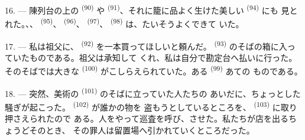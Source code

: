 16. --- 陳列台の上の \textsuperscript{(90)} や
\textsuperscript{(91)}、それに籠に品よく生けた美しい \textsuperscript{(94)} にも
見とれた。、、
\textsuperscript{(95)}、 \textsuperscript{(96)}、
\textsuperscript{(97)}、 \textsuperscript{(98)} は、たいそうよくできて
いた。

\VUsaut{4.4mm}
\VUsaut{2.8mm}

17. --- 私は祖父に、 \textsuperscript{(92)} を一本買ってほしいと頼んだ。
 \textsuperscript{(93)} のそばの箱に入っていたものである。祖父は承知して
くれ、私は自分で勘定台へ払いに行った。そのそばでは大きな
\textsuperscript{(100)} がこしらえられていた。ある \textsuperscript{(99)} あての
ものである。

18. --- 突然、美術の \textsuperscript{(101)} のそばに立っていた人たちの
あいだに、ちょっとした騒ぎが起こった。 \textsuperscript{(102)} が誰かの物を
盗もうとしているところを、 \textsuperscript{(103)} に取り押さえられたので
ある。人をやって巡査を呼び、させた。私たちが店を出るちょうどそのとき、
その罪人は留置場へ引かれていくところだった。
\VUsaut{6.0mm}
\VUfilet{22mm}
